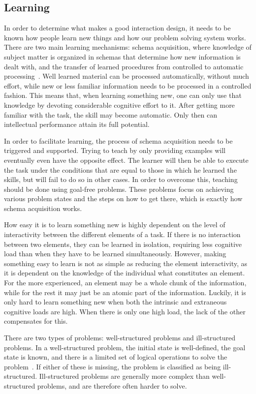 \subsection{Learning}
In order to determine what makes a good interaction design, it needs to be known how people learn new things and how our problem solving system works. There are two main learning mechanisms: schema acquisition, where knowledge of subject matter is organized in schemas that determine how new information is dealt with, and the transfer of learned procedures from controlled to automatic processing~\cite{sweller1994cognitive}. Well learned material can be processed automatically, without much effort, while new or less familiar information needs to be processed in a controlled fashion. This means that, when learning something new, one can only use that knowledge by devoting considerable cognitive effort to it. After getting more familiar with the task, the skill may become automatic. Only then can intellectual performance attain its full potential.

In order to facilitate learning, the process of schema acquisition needs to be triggered and supported. Trying to teach by only providing examples will eventually even have the opposite effect. The learner will then be able to execute the task under the conditions that are equal to those in which he learned the skills, but will fail to do so in other cases. In order to overcome this, teaching should be done using goal-free problems. These problems focus on achieving various problem states and the steps on how to get there, which is exactly how schema acquisition works.

How easy it is to learn something new is highly dependent on the level of interactivity between the different elements of a task. If there is no interaction between two elements, they can be learned in isolation, requiring less cognitive load than when they have to be learned simultaneously. However, making something easy to learn is not as simple as reducing the element interactivity, as it is dependent on the knowledge of the individual what constitutes an element. For the more experienced, an element may be a whole chunk of the information, while for the rest it may just be an atomic part of the information. Luckily, it is only hard to learn something new when both the intrinsic and extraneous cognitive loads are high. When there is only one high load, the lack of the other compensates for this.

There are two types of problems: well-structured problems and ill-structured problems. In a well-structured problem, the initial state is well-defined, the goal state is known, and there is a limited set of logical operations to solve the problem~\cite{jonassen2000toward}. If either of these is missing, the problem is classified as being ill-structured. Ill-structured problems are generally more complex than well-structured problems, and are therefore often harder to solve.

